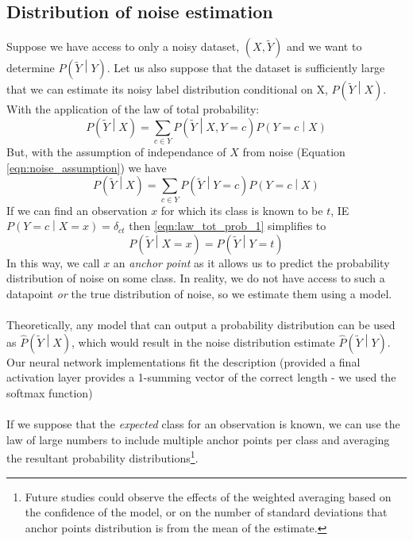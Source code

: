 \documentclass{article} %
\newcommand{\PR}[1]{{P\left(#1\right)}}
\newcommand{\PRh}[1]{{\widehat P\left(#1\right)}}
\newcommand{\B}[1]{{\left(#1\right)}}
\newcommand{\Yn}{\widetilde{Y}}
\newcommand{\noiseassumption}{assumption of independance of $X$ from noise }
\begin{document}
\subsection{Distribution of noise estimation}
Suppose we have access to only a noisy dataset, $\B{X, \Yn}$ and we want to determine $\PR{\Yn \middle| Y}$. Let us also suppose that the dataset is sufficiently large that we can estimate its noisy label distribution conditional on X, $\PR{\Yn \middle| X}$. With the application of the law of total probability:
\begin{equation*}
    \PR{\Yn \middle| X} = \sum\limits_{c \in Y} \PR{\Yn \middle| X, Y=c} \PR{Y=c \middle| X}
\end{equation*}
But, with the \noiseassumption (Equation \ref{eqn:noise_assumption}) we have
\begin{equation}
\label{eqn:law_tot_prob_1}
    \PR{\Yn \middle| X} = \sum\limits_{c \in Y} \PR{\Yn \middle| Y=c} \PR{Y = c \middle| X}
\end{equation}
If we can find an observation $x$ for which its class is known to be $t$, IE $\PR{Y=c\middle|X=x} = \delta_{ct}$ then \ref{eqn:law_tot_prob_1} simplifies to
\begin{equation}
    \label{eqn:anchor}
    \PR{\Yn \middle| X=x} = \PR{\Yn \middle| Y=t}
\end{equation}
In this way, we call $x$ an \emph{anchor point} as it allows us to predict the probability distribution of noise on some class.
In reality, we do not have access to such a datapoint \emph{or} the true distribution of noise, so we estimate them using a model.
\\\\
Theoretically, any model that can output a probability distribution can be used as $\PRh{\Yn \middle| X}$, which would result in the noise distribution estimate $\PRh{\Yn \middle| Y}$.
Our neural network implementations fit the description (provided a final activation layer provides a 1-summing vector of the correct length - we used the softmax function)
\\\\
If we suppose that the \emph{expected} class for an observation is known, we can use the law of large numbers to include multiple anchor points per class and averaging the resultant probability distributions\footnote{Future studies could observe the effects of the weighted averaging based on the confidence of the model, or on the number of standard deviations that anchor points distribution is from the mean of the estimate.}.
\end{document}
